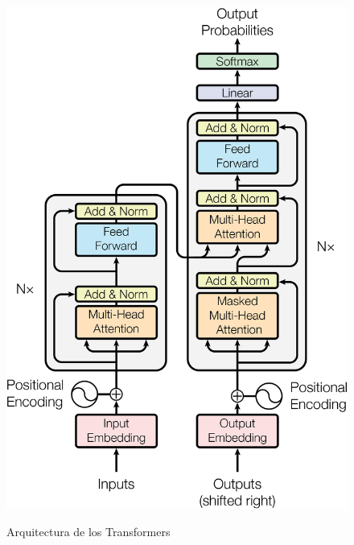 \begin{figure}[h]
	\caption{Arquitectura de los Transformers}
	\centering
	\includegraphics[scale=0.15]{Images & Logos/Transformers.png} 
	\label{figure:transformers}
\end{figure}
 

